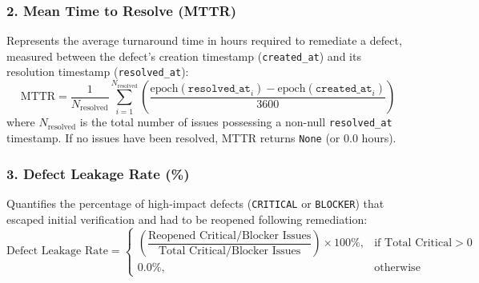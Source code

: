 \documentclass[11pt,a4paper]{article}
\begin{document}
\subsubsection{2. Mean Time to Resolve (MTTR)}
Represents the average turnaround time in hours required to remediate a defect, measured between the defect's creation timestamp (\texttt{created\_at}) and its resolution timestamp (\texttt{resolved\_at}):
\begin{equation}
\text{MTTR} = \frac{1}{N_{\text{resolved}}} \sum_{i=1}^{N_{\text{resolved}}} \left( \frac{\text{epoch}(\texttt{resolved\_at}_i) - \text{epoch}(\texttt{created\_at}_i)}{3600} \right)
\end{equation}
where $N_{\text{resolved}}$ is the total number of issues possessing a non-null \texttt{resolved\_at} timestamp. If no issues have been resolved, MTTR returns \texttt{None} (or $0.0$ hours).

\subsubsection{3. Defect Leakage Rate (\%)}
Quantifies the percentage of high-impact defects (\texttt{CRITICAL} or \texttt{BLOCKER}) that escaped initial verification and had to be reopened following remediation:
\begin{equation}
\text{Defect Leakage Rate} = 
\begin{cases}
\left( \dfrac{\text{Reopened Critical/Blocker Issues}}{\text{Total Critical/Blocker Issues}} \right) \times 100\%, & \text{if } \text{Total Critical} > 0 \\
0.0\%, & \text{otherwise}
\end{cases}
\end{equation}
\end{document}
